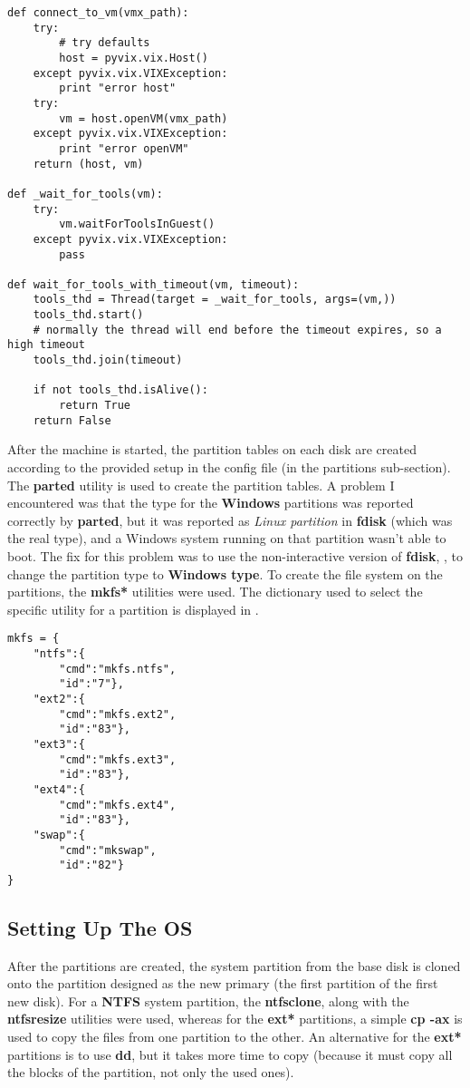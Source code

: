 \lstset{language=Python,caption=wait for VM to boot up,label=lst:pyvix-wait-tools}
\begin{lstlisting}
def connect_to_vm(vmx_path):
	try:
		# try defaults
		host = pyvix.vix.Host()
	except pyvix.vix.VIXException:
		print "error host"
	try:
		vm = host.openVM(vmx_path)
	except pyvix.vix.VIXException:
		print "error openVM"
	return (host, vm)

def _wait_for_tools(vm):
	try:
		vm.waitForToolsInGuest()
	except pyvix.vix.VIXException:
		pass

def wait_for_tools_with_timeout(vm, timeout):
	tools_thd = Thread(target = _wait_for_tools, args=(vm,))
	tools_thd.start()
	# normally the thread will end before the timeout expires, so a high timeout
	tools_thd.join(timeout)

	if not tools_thd.isAlive():
		return True
	return False
\end{lstlisting}

After the machine is started, the partition tables on each disk are created
according to the provided setup in the config file (in the partitions
sub-section). The \textbf{parted} utility is used to create the partition
tables. A problem I encountered was that the type for the \textbf{Windows}
partitions was reported correctly by \textbf{parted}, but it was reported as
\textit{Linux partition} in \textbf{fdisk} (which was the real type), and a
Windows system running on that partition wasn't able to boot.  The fix for this
problem was to use the non-interactive version of \textbf{fdisk},
, to change the partition type to \textbf{Windows type}. To
create the file system on the partitions, the \textbf{mkfs*} utilities were
used. The dictionary used to select the specific utility for a partition is
displayed in .

\lstset{caption=utilities to create file systems,label=lst:mkfs-dict}
\begin{lstlisting}
mkfs = { 
	"ntfs":{
		"cmd":"mkfs.ntfs", 
		"id":"7"},
	"ext2":{
		"cmd":"mkfs.ext2",
		"id":"83"},
	"ext3":{
		"cmd":"mkfs.ext3",
		"id":"83"},
	"ext4":{
		"cmd":"mkfs.ext4",
		"id":"83"},
	"swap":{
		"cmd":"mkswap",
		"id":"82"}
}
\end{lstlisting}

\subsection{Setting Up The OS}
\label{sub-sec:vmware-os-setup}
After the partitions are created, the system partition from the base disk is
cloned onto the partition designed as the new primary (the first partition of
the first new disk). For a \textbf{NTFS} system partition, the
\textbf{ntfsclone}, along with the \textbf{ntfsresize} utilities were used,
whereas for the \textbf{ext*} partitions, a simple \textbf{cp -ax} is used to
copy the files from one partition to the other. An alternative for the
\textbf{ext*} partitions is to use \textbf{dd}, but it takes more time to copy
(because it must copy all the blocks of the partition, not only the used ones).

